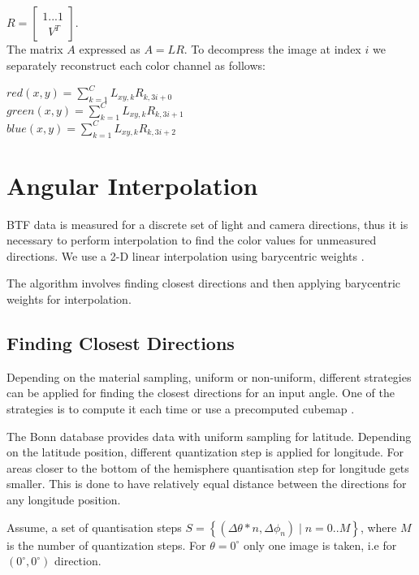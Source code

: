 {\centering $
R=\begin{bmatrix}
 1 ... 1   \\ 
  \, \, \, V^{T}
\end{bmatrix}.$ \\}
  The matrix $A$ expressed as $A=LR$. To decompress the image at index $i$ we separately reconstruct each color channel as follows: 


{\centering $red(x,y)=\sum_{k=1}^{C}L_{xy,k}R_{k,3i+0}$ \\}
{\centering $green(x,y)=\sum_{k=1}^{C}L_{xy,k}R_{k,3i+1}$ \\}
{\centering $blue(x,y)=\sum_{k=1}^{C}L_{xy,k}R_{k,3i+2}$ \\}


\section{Angular Interpolation}
\label{chapter:interpolation}


BTF data is measured for a discrete set of light and camera directions, thus it is necessary to perform interpolation to find the color values for unmeasured directions.
We use a 2-D linear interpolation using barycentric weights \cite{haindl_visual}. 

The algorithm involves finding closest directions and then applying barycentric weights for interpolation.

\subsection{Finding Closest Directions}
\label{chapter:finding_triangle}
Depending on the material sampling, uniform or non-uniform, different strategies can be applied for finding the closest directions for an input angle.
One of the strategies is to compute it  each time or use a precomputed cubemap \cite{haindl}.

The Bonn database \cite{btfBonn} provides data with uniform sampling for latitude. Depending on the latitude position, different quantization step is applied for longitude.
For areas closer to the bottom of the hemisphere quantisation step for longitude gets smaller.
This is done to have relatively equal distance between the directions for any longitude position.


 Assume, a set of quantisation steps $S=\left \{ (\Delta \theta*n , \Delta \phi_n ) \mid n=0..M \right \}$, where $M$ is the number of quantization steps.
For $\theta=0^{\circ}$ only one image is taken, i.e for $(0^{\circ},0^{\circ})$ direction.
  
